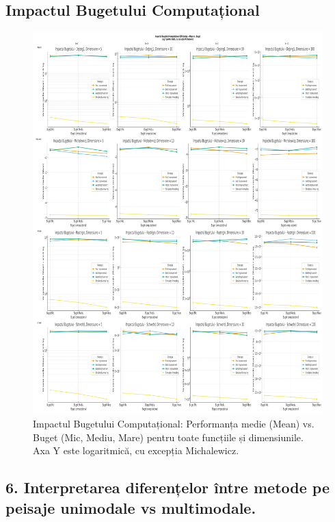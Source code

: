 \documentclass[
]{article}
\begin{document}
\subsection{Impactul Bugetului Computațional}

\begin{figure}[htbp]
	\centering
	\includegraphics[width=\textwidth]{vertopal_3cc9e404d6084a9aa4179e4b559e5481/media/image10.png}
	\caption{Impactul Bugetului Computațional: Performanța medie (Mean) vs. Buget (Mic, Mediu, Mare) pentru toate funcțiile și dimensiunile. Axa Y este logaritmică, cu excepția Michalewicz.}
	\label{fig:impact-buget}
\end{figure}

\hypertarget{section}{%
\subsection{}\label{section}}

\hypertarget{interpretarea-diferenux21belor-uxeentre-metode-pe-peisaje-unimodale-vs-multimodale.}{%
\subsection{6. Interpretarea diferențelor între metode pe peisaje
unimodale vs
multimodale.}\label{interpretarea-diferenux21belor-uxeentre-metode-pe-peisaje-unimodale-vs-multimodale.}}
\end{document}
